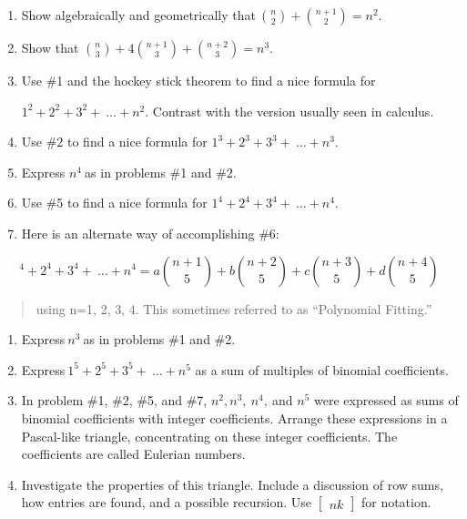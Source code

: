 \begin{enumerate}
\def\labelenumi{\arabic{enumi}.}

\item
  Show algebraically and geometrically that\(\
\binom{n}{2}
 +
\binom{n + 1}{2}
 = n^{2}\).
\item
  Show that \(\binom{n}{3}
 + 4
\binom{n + 1}{3}
 +
\binom{n + 2}{3}
 = n^{3}\).
\item
  Use \#1 and the hockey stick theorem to find a nice formula for

\(1^{2} + 2^{2} + 3^{2} + \ \ldots + n^{2}\). Contrast with the
  version usually seen in calculus.
\item
  Use \#2 to find a nice formula for
  \(1^{3} + 2^{3} + 3^{3} + \ \ldots + n^{3}\).
\item
  Express \(n^{4}\ \)as in problems \#1 and \#2.
\item
  Use \#5 to find a nice formula for
  \(1^{4} + 2^{4} + 3^{4} + \ \ldots + n^{4}\).
\item
  Here is an alternate way of accomplishing \#6:

\end{enumerate}

\[
^{4} + 2^{4} + 3^{4} + \ \ldots + n^{4} = a\binom{n + 1}{5}  + b\binom{n + 2}{5}  + c\binom{n + 3}{5}  + d\binom{n + 4}{5}
\]
\begin{quote}
using n=1, 2, 3, 4. This sometimes referred to as ``Polynomial
Fitting.''

\end{quote}
\begin{enumerate}
\def\labelenumi{\arabic{enumi}.}

\item
  Express\(\ n^{3}\ \)as in problems \#1 and \#2.
\item
  Express\(\ 1^{5} + 2^{5} + 3^{5} + \ \ldots + n^{5}\) as a sum of
  multiples of binomial coefficients.
\item
  In problem \#1, \#2, \#5, and \#7, \(n^{2},n^{3},\ n^{4},\ \)and
  \(n^{5}\) were expressed as sums of binomial coefficients with integer
  coefficients. Arrange these expressions in a Pascal-like triangle,
  concentrating on these integer coefficients. The coefficients are
  called Eulerian numbers.
\item
  Investigate the properties of this triangle. Include a discussion of
  row sums, how entries are found, and a possible recursion. Use
  \(\begin{bmatrix}
  n
  k
  \end{bmatrix}
\) for notation.
\end{enumerate}

